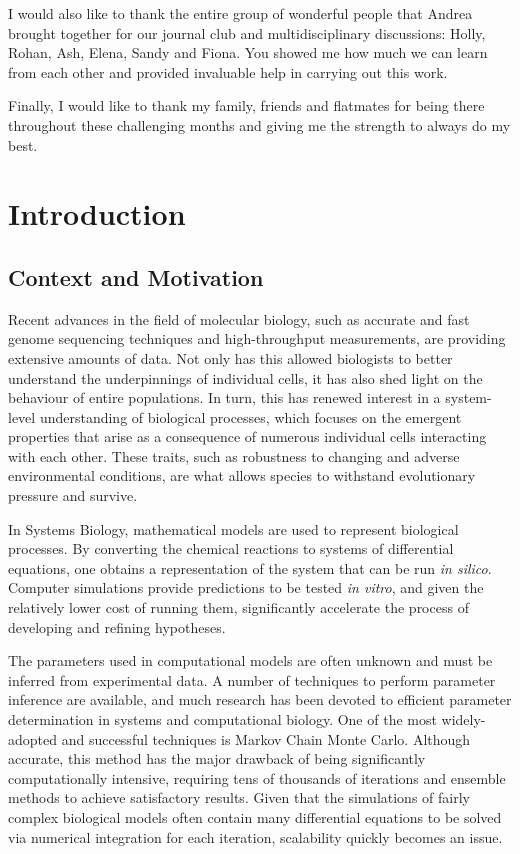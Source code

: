 \documentclass[bsc,frontabs,singlespacing,parskip,deptreport]{infthesis}
\begin{document}
\begin{preliminary}
I would also like to thank the entire group of wonderful people that Andrea brought together for our journal club and multidisciplinary discussions: Holly, Rohan, Ash, Elena, Sandy and Fiona. You showed me how much we can learn from each other and provided invaluable help in carrying out this work.

Finally, I would like to thank my family, friends and flatmates for being there throughout these challenging months and giving me the strength to always do my best.

{
  \hypersetup{linkcolor=black}
  \tableofcontents
}

\end{preliminary}


\chapter{Introduction}

\section{Context and Motivation}
Recent advances in the field of molecular biology, such as accurate and fast genome sequencing techniques and high-throughput measurements, are providing extensive amounts of data. Not only has this allowed biologists to better understand the underpinnings of individual cells, it has also shed light on the behaviour of entire populations. In turn, this has renewed interest in a system-level understanding of biological processes, which focuses on the emergent properties that arise as a consequence of numerous individual cells interacting with each other. These traits, such as robustness to changing and adverse environmental conditions, are what allows species to withstand evolutionary pressure and survive. 

In Systems Biology, mathematical models are used to represent biological processes. By converting the chemical reactions to systems of differential equations, one obtains a representation of the system that can be run \textit{in silico}. Computer simulations provide predictions to be tested \textit{in vitro}, and given the relatively lower cost of running them, significantly accelerate the process of developing and refining hypotheses.

The parameters used in computational models are often unknown and must be inferred from experimental data. A number of techniques to perform parameter inference are available, and much research has been devoted to efficient parameter determination in systems and computational biology. One of the most widely-adopted and successful techniques is Markov Chain Monte Carlo. Although accurate, this method has the major drawback of being significantly computationally intensive, requiring tens of thousands of iterations and ensemble methods to achieve satisfactory results. Given that the simulations of fairly complex biological models often contain many differential equations to be solved via numerical integration for each iteration, scalability quickly becomes an issue.
\end{document}
